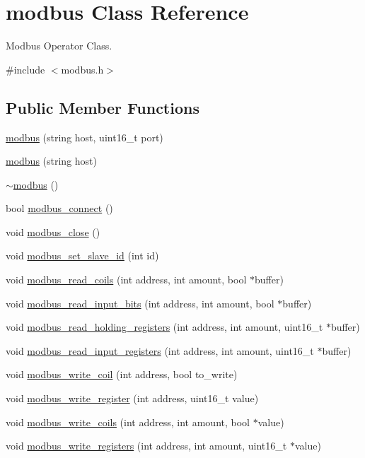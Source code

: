 \hypertarget{classmodbus}{}\section{modbus Class Reference}
\label{classmodbus}


Modbus Operator Class.  




{\ttfamily \#include $<$modbus.\+h$>$}

\subsection*{Public Member Functions}
\begin{DoxyCompactItemize}
\item 
\mbox{\hyperlink{classmodbus_a8a92b53fdbacc156cd2b5f21a244b5f2}{modbus}} (string host, uint16\+\_\+t port)
\item 
\mbox{\hyperlink{classmodbus_a6902af6b4f02a3cc07ef040c389360d2}{modbus}} (string host)
\item 
\mbox{\hyperlink{classmodbus_a28daaab3b7a8c838636c639d2eb14e4f}{$\sim$modbus}} ()
\item 
bool \mbox{\hyperlink{classmodbus_a13709baee171c97231a33ec4edfa1051}{modbus\+\_\+connect}} ()
\item 
void \mbox{\hyperlink{classmodbus_a9b0db97f942a083431b5374055d4bf1b}{modbus\+\_\+close}} ()
\item 
void \mbox{\hyperlink{classmodbus_a6880efa2a3859ce0752c016588998ffe}{modbus\+\_\+set\+\_\+slave\+\_\+id}} (int id)
\item 
void \mbox{\hyperlink{classmodbus_ae4f8480f4062d7bed3ff463da64d0027}{modbus\+\_\+read\+\_\+coils}} (int address, int amount, bool $\ast$buffer)
\item 
void \mbox{\hyperlink{classmodbus_a22e2773a0475961956eeee0f7056c6c0}{modbus\+\_\+read\+\_\+input\+\_\+bits}} (int address, int amount, bool $\ast$buffer)
\item 
void \mbox{\hyperlink{classmodbus_a2a2079dc10a200764984497fea7c85b3}{modbus\+\_\+read\+\_\+holding\+\_\+registers}} (int address, int amount, uint16\+\_\+t $\ast$buffer)
\item 
void \mbox{\hyperlink{classmodbus_a228dcada3a0f37e9d1f346842fb29a39}{modbus\+\_\+read\+\_\+input\+\_\+registers}} (int address, int amount, uint16\+\_\+t $\ast$buffer)
\item 
void \mbox{\hyperlink{classmodbus_a8717e5472d5a536beb0308bdeeac2233}{modbus\+\_\+write\+\_\+coil}} (int address, bool to\+\_\+write)
\item 
void \mbox{\hyperlink{classmodbus_ab70c70f8b76075be92304f5f4bad9c6b}{modbus\+\_\+write\+\_\+register}} (int address, uint16\+\_\+t value)
\item 
void \mbox{\hyperlink{classmodbus_a26201b5f872bce56f665d905ffcaaa97}{modbus\+\_\+write\+\_\+coils}} (int address, int amount, bool $\ast$value)
\item 
void \mbox{\hyperlink{classmodbus_ad91dab7ef70066e3fcb03cf6d9a72cc3}{modbus\+\_\+write\+\_\+registers}} (int address, int amount, uint16\+\_\+t $\ast$value)
\end{DoxyCompactItemize}


